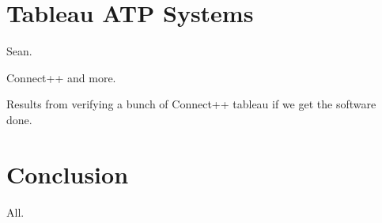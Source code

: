 \documentclass[runningheads]{llncs}
\begin{document}
\section{Tableau ATP Systems}
\label{ATPSystems}

Sean.

Connect++ and more.

Results from verifying a bunch of Connect++ tableau if we get the software done.

\section{Conclusion}
\label{Conclusion}

All.



\end{document}

